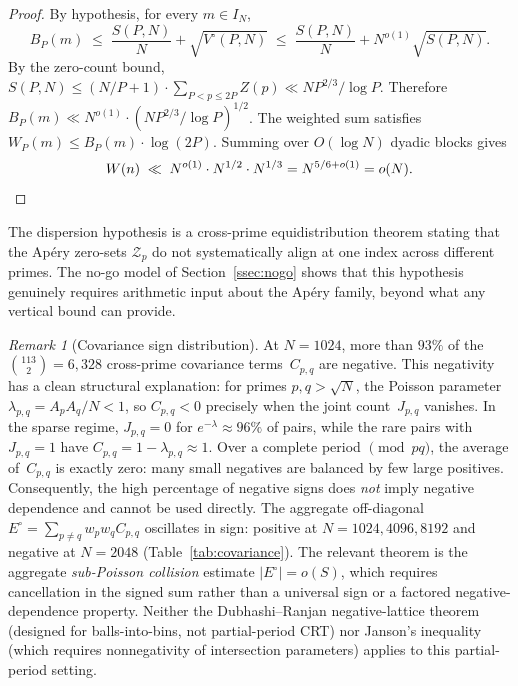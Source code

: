 \documentclass[11pt]{article}
\theoremstyle{definition}
\theoremstyle{remark}
\newtheorem{remark}[theorem]{Remark}
\begin{document}
\begin{proof}
By hypothesis, for every $m \in I_N$,
\[
  B_P(m) \;\le\; \frac{S(P,N)}{N} + \sqrt{V^\circ(P,N)}
  \;\le\; \frac{S(P,N)}{N} + N^{o(1)}\sqrt{S(P,N)}.
\]
By the zero-count bound, $S(P,N) \le (N/P + 1)\cdot
\sum_{P < p \le 2P} Z(p) \ll N P^{2/3}/\log P$.
Therefore $B_P(m) \ll N^{o(1)} \cdot (NP^{2/3}/\log P)^{1/2}$.
The weighted sum satisfies
$W_P(m) \le B_P(m)\cdot \log(2P)$.
Summing over $O(\log N)$ dyadic blocks gives
\[
  W(n) \;\ll\; N^{o(1)}\cdot N^{1/2}\cdot N^{1/3}
  = N^{5/6+o(1)} = o(N). \qedhere
\]
\end{proof}

The dispersion hypothesis is a cross-prime equidistribution
theorem stating that the Ap\'ery zero-sets
$\mathcal{Z}_p$ do not systematically align at
one index across different primes.
The no-go model of Section~\ref{ssec:nogo} shows
that this hypothesis genuinely requires arithmetic
input about the Ap\'ery family, beyond what
any vertical bound can provide.

\begin{remark}[Covariance sign distribution]\label{rem:negative-crt}
At $N = 1024$, more than $93\%$ of the
$\binom{113}{2} = 6{,}328$ cross-prime
covariance terms~$C_{p,q}$ are negative.
This negativity has a clean structural explanation:
for primes $p, q > \sqrt{N}$, the Poisson
parameter $\lambda_{p,q} = A_p A_q/N < 1$,
so $C_{p,q} < 0$ precisely when the joint
count~$J_{p,q}$ vanishes. In the sparse regime,
$J_{p,q} = 0$ for $e^{-\lambda} \approx 96\%$
of pairs, while the rare pairs with $J_{p,q} = 1$
have $C_{p,q} = 1 - \lambda_{p,q} \approx 1$.
Over a complete period $\pmod{pq}$,
the average of~$C_{p,q}$ is exactly zero:
many small negatives are balanced by
few large positives.
Consequently, the high percentage of negative
signs does \emph{not} imply negative dependence
and cannot be used directly.
The aggregate off-diagonal
$E^\circ = \sum_{p \ne q} w_p w_q C_{p,q}$
oscillates in sign: positive at $N = 1024, 4096, 8192$
and negative at $N = 2048$ (Table~\ref{tab:covariance}).
The relevant theorem is the aggregate
\emph{sub-Poisson collision} estimate
$|E^\circ| = o(S)$, which requires cancellation
in the signed sum rather than a universal
sign or a factored negative-dependence property.
Neither the Dubhashi--Ranjan negative-lattice
theorem (designed for balls-into-bins, not
partial-period CRT) nor Janson's inequality
(which requires nonnegativity of intersection
parameters) applies to this partial-period
setting.
\end{remark}
\end{document}
